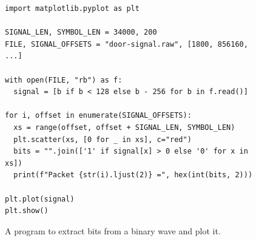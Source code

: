 \begin{figure}[ht]
    \begin{verbatim}
import matplotlib.pyplot as plt

SIGNAL_LEN, SYMBOL_LEN = 34000, 200
FILE, SIGNAL_OFFSETS = "door-signal.raw", [1800, 856160, ...]

with open(FILE, "rb") as f:
  signal = [b if b < 128 else b - 256 for b in f.read()]

for i, offset in enumerate(SIGNAL_OFFSETS):
  xs = range(offset, offset + SIGNAL_LEN, SYMBOL_LEN)
  plt.scatter(xs, [0 for _ in xs], c="red")
  bits = "".join(['1' if signal[x] > 0 else '0' for x in xs])
  print(f"Packet {str(i).ljust(2)} =", hex(int(bits, 2)))

plt.plot(signal)
plt.show()
    \end{verbatim}
    \caption{A program to extract bits from a binary wave and plot it.}
    \label{lst:extract-bits}
\end{figure}

